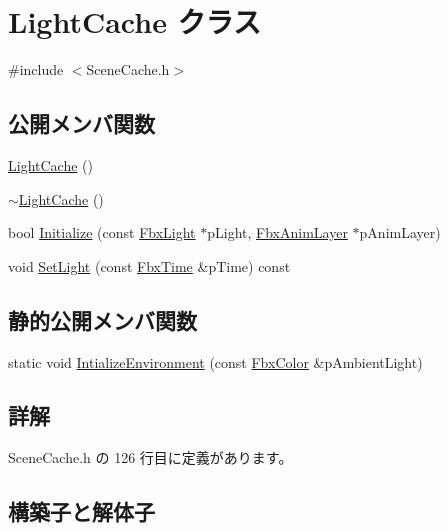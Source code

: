 \hypertarget{class_light_cache}{}\section{Light\+Cache クラス}
\label{class_light_cache}


{\ttfamily \#include $<$Scene\+Cache.\+h$>$}

\subsection*{公開メンバ関数}
\begin{DoxyCompactItemize}
\item 
\hyperlink{class_light_cache_a72fd5bc449b13503e86d00ea65e3e2ae}{Light\+Cache} ()
\item 
\hyperlink{class_light_cache_ad747d6d03a917cfab8c33fcc54349af3}{$\sim$\+Light\+Cache} ()
\item 
bool \hyperlink{class_light_cache_af1360bf788b0435dc2ad38f62e1ce848}{Initialize} (const \hyperlink{class_fbx_light}{Fbx\+Light} $\ast$p\+Light, \hyperlink{class_fbx_anim_layer}{Fbx\+Anim\+Layer} $\ast$p\+Anim\+Layer)
\item 
void \hyperlink{class_light_cache_a2942547e3b3262e1da08380b4c7323df}{Set\+Light} (const \hyperlink{class_fbx_time}{Fbx\+Time} \&p\+Time) const
\end{DoxyCompactItemize}
\subsection*{静的公開メンバ関数}
\begin{DoxyCompactItemize}
\item 
static void \hyperlink{class_light_cache_a4001efcf88a816364fea9cfce1c16cac}{Intialize\+Environment} (const \hyperlink{class_fbx_color}{Fbx\+Color} \&p\+Ambient\+Light)
\end{DoxyCompactItemize}


\subsection{詳解}


 Scene\+Cache.\+h の 126 行目に定義があります。



\subsection{構築子と解体子}
\mbox{\label{class_light_cache_a72fd5bc449b13503e86d00ea65e3e2ae}} 

